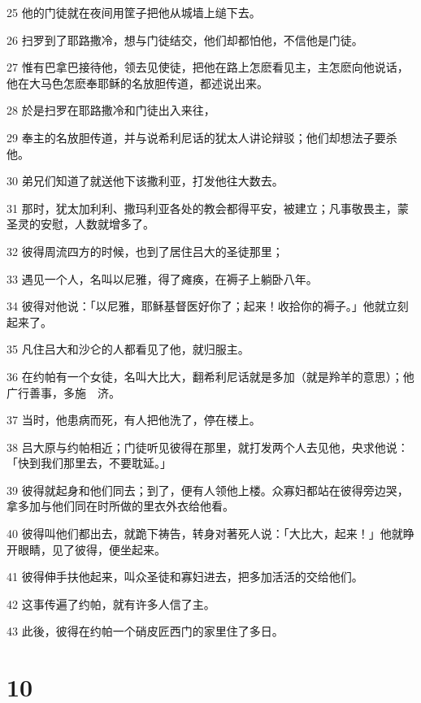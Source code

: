 \par 25 他的门徒就在夜间用筐子把他从城墙上缒下去。
\par 26 扫罗到了耶路撒冷，想与门徒结交，他们却都怕他，不信他是门徒。
\par 27 惟有巴拿巴接待他，领去见使徒，把他在路上怎麽看见主，主怎麽向他说话，他在大马色怎麽奉耶稣的名放胆传道，都述说出来。
\par 28 於是扫罗在耶路撒冷和门徒出入来往，
\par 29 奉主的名放胆传道，并与说希利尼话的犹太人讲论辩驳；他们却想法子要杀他。
\par 30 弟兄们知道了就送他下该撒利亚，打发他往大数去。
\par 31 那时，犹太加利利、撒玛利亚各处的教会都得平安，被建立；凡事敬畏主，蒙圣灵的安慰，人数就增多了。
\par 32 彼得周流四方的时候，也到了居住吕大的圣徒那里；
\par 33 遇见一个人，名叫以尼雅，得了瘫痪，在褥子上躺卧八年。
\par 34 彼得对他说：「以尼雅，耶稣基督医好你了；起来！收拾你的褥子。」他就立刻起来了。
\par 35 凡住吕大和沙仑的人都看见了他，就归服主。
\par 36 在约帕有一个女徒，名叫大比大，翻希利尼话就是多加（就是羚羊的意思）；他广行善事，多施　济。
\par 37 当时，他患病而死，有人把他洗了，停在楼上。
\par 38 吕大原与约帕相近；门徒听见彼得在那里，就打发两个人去见他，央求他说：「快到我们那里去，不要耽延。」
\par 39 彼得就起身和他们同去；到了，便有人领他上楼。众寡妇都站在彼得旁边哭，拿多加与他们同在时所做的里衣外衣给他看。
\par 40 彼得叫他们都出去，就跪下祷告，转身对著死人说：「大比大，起来！」他就睁开眼睛，见了彼得，便坐起来。
\par 41 彼得伸手扶他起来，叫众圣徒和寡妇进去，把多加活活的交给他们。
\par 42 这事传遍了约帕，就有许多人信了主。
\par 43 此後，彼得在约帕一个硝皮匠西门的家里住了多日。

\chapter{10}


